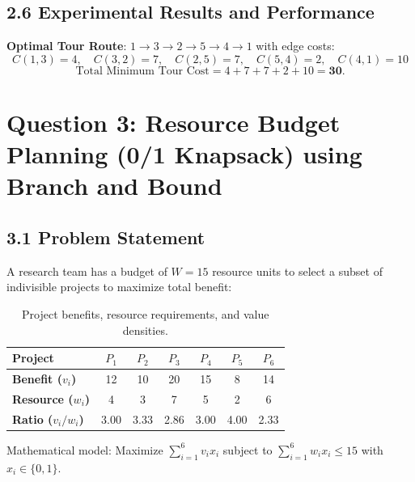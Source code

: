 \documentclass[12pt]{article}
\begin{document}
\subsection*{2.6 Experimental Results and Performance}
\begin{table}[H]
\centering
{}
\caption{Empirical comparison for Traveling Salesperson Problem.}
\end{table}

\textbf{Optimal Tour Route}:
$1 \to 3 \to 2 \to 5 \to 4 \to 1$ with edge costs:
\[
C(1, 3) = 4, \quad C(3, 2) = 7, \quad C(2, 5) = 7, \quad C(5, 4) = 2, \quad C(4, 1) = 10
\]
\[
\text{Total Minimum Tour Cost} = 4 + 7 + 7 + 2 + 10 = \mathbf{30}.
\]

\vspace{0.4cm}

\section*{Question 3: Resource Budget Planning (0/1 Knapsack) using Branch and Bound}

\subsection*{3.1 Problem Statement}
A research team has a budget of $W = 15$ resource units to select a subset of indivisible projects to maximize total benefit:
\begin{table}[H]
\centering
\begin{tabular}{lcccccc}
\toprule
\textbf{Project} & $P_1$ & $P_2$ & $P_3$ & $P_4$ & $P_5$ & $P_6$ \\
\midrule
\textbf{Benefit ($v_i$)} & 12 & 10 & 20 & 15 & 8 & 14 \\
\textbf{Resource ($w_i$)} & 4 & 3 & 7 & 5 & 2 & 6 \\
\textbf{Ratio ($v_i/w_i$)} & 3.00 & 3.33 & 2.86 & 3.00 & 4.00 & 2.33 \\
\bottomrule
\end{tabular}
\caption{Project benefits, resource requirements, and value densities.}
\end{table}
Mathematical model: Maximize $\sum_{i=1}^6 v_i x_i$ subject to $\sum_{i=1}^6 w_i x_i \le 15$ with $x_i \in \{0, 1\}$.
\end{document}
